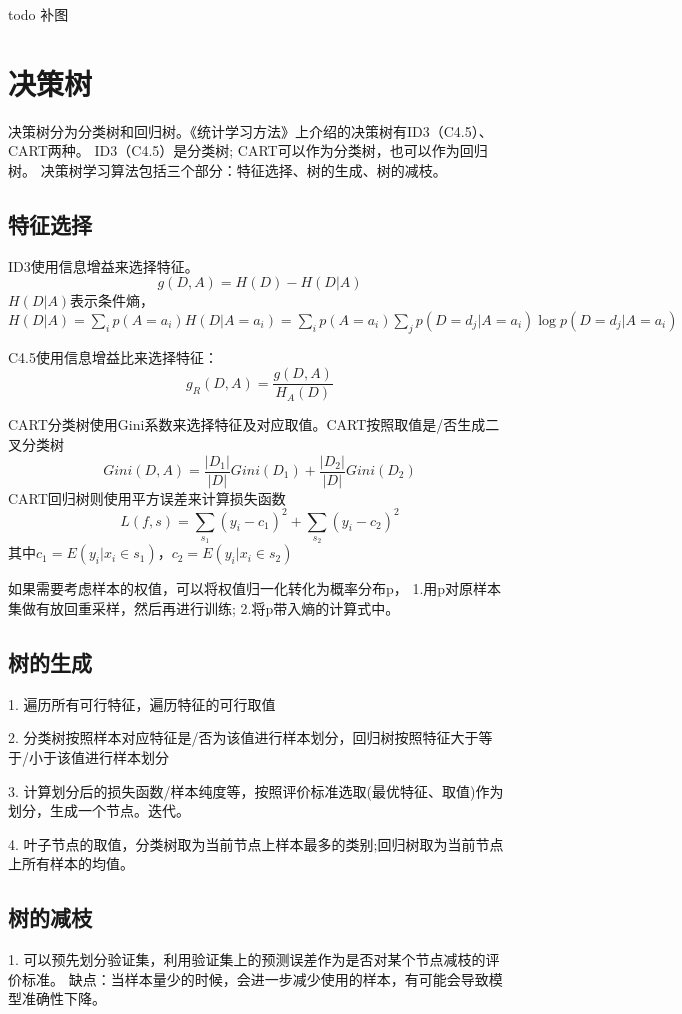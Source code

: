 todo 补图

\section{决策树}
决策树分为分类树和回归树。《统计学习方法》上介绍的决策树有ID3（C4.5）、CART两种。
ID3（C4.5）是分类树; CART可以作为分类树，也可以作为回归树。
决策树学习算法包括三个部分：特征选择、树的生成、树的减枝。
\subsection{特征选择}
ID3使用信息增益来选择特征。
\begin{equation*}
    g(D,A) = H(D) - H(D|A)
\end{equation*}
$H(D|A)$表示条件熵，$H(D|A) = \sum_i p(A=a_i) H(D|A=a_i) = \sum_i p(A=a_i) \sum_j p(D=d_j|A=a_i) \log p(D=d_j|A=a_i)$

C4.5使用信息增益比来选择特征：
\begin{equation*}
    g_R(D,A) = \frac{g(D,A)}{H_A(D)}
\end{equation*}

CART分类树使用Gini系数来选择特征及对应取值。CART按照取值是/否生成二叉分类树
\begin{equation*}
    Gini(D,A) = \frac{|D_1|}{|D|}Gini(D_1) + \frac{|D_2|}{|D|}Gini(D_2)
\end{equation*}
CART回归树则使用平方误差来计算损失函数
\begin{equation*}
    L(f,s) = \sum_{s_1} (y_i - c_1)^2 + \sum_{s_2} (y_i - c_2)^2
\end{equation*}
其中$c_1 = E(y_i|x_i \in s_1)$，$c_2 = E(y_i|x_i \in s_2)$

如果需要考虑样本的权值，可以将权值归一化转化为概率分布p，
1.用p对原样本集做有放回重采样，然后再进行训练; 
2.将p带入熵的计算式中。


\subsection{树的生成}
1. 遍历所有可行特征，遍历特征的可行取值

2. 分类树按照样本对应特征是/否为该值进行样本划分，回归树按照特征大于等于/小于该值进行样本划分

3. 计算划分后的损失函数/样本纯度等，按照评价标准选取(最优特征、取值)作为划分，生成一个节点。迭代。

4. 叶子节点的取值，分类树取为当前节点上样本最多的类别;回归树取为当前节点上所有样本的均值。

\subsection{树的减枝}
1. 可以预先划分验证集，利用验证集上的预测误差作为是否对某个节点减枝的评价标准。
缺点：当样本量少的时候，会进一步减少使用的样本，有可能会导致模型准确性下降。

